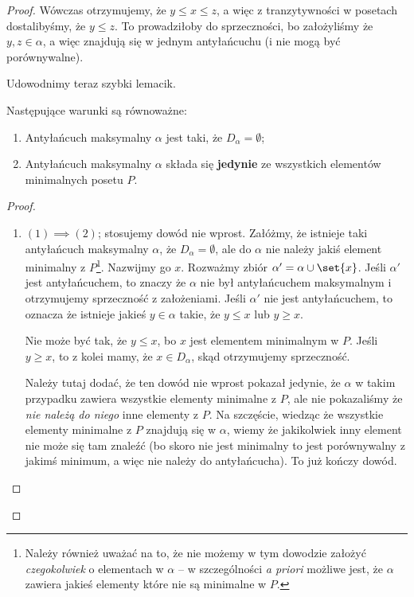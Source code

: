 \begin{proof}
        Wówczas otrzymujemy, że \(y \leq x \leq z\), a więc z tranzytywności w posetach dostalibyśmy, że \(y \leq z\). To prowadziłoby do sprzeczności, bo założyliśmy że \(y, z \in \alpha\), a więc znajdują się w jednym antyłańcuchu (i nie mogą być porównywalne).

        Udowodnimy teraz szybki lemacik.
        
        \begin{lemma}
            \label{dilworth-lemma-1}
            Następujące warunki są równoważne:
            
            \begin{enumerate}
                \item Antyłańcuch maksymalny \(\alpha\) jest taki, że \(D_{\alpha} = \emptyset\);
                \item Antyłańcuch maksymalny \(\alpha\) składa się \textbf{jedynie} ze wszystkich elementów minimalnych posetu \(P\). 
            \end{enumerate}
        \end{lemma}
        \begin{proof}
            \begin{enumerate}
                \item \( (1) \implies (2) \); stosujemy dowód nie wprost. Załóżmy, że istnieje taki antyłańcuch maksymalny \(\alpha\), że \(D_{\alpha} = \emptyset\), ale do \(\alpha\) nie należy jakiś element minimalny z \(P\)\footnote{Należy również uważać na to, że nie możemy w tym dowodzie założyć \textit{czegokolwiek} o elementach w \(\alpha\) -- w szczególności \textit{a priori} możliwe jest, że \(\alpha\) zawiera jakieś elementy które nie są minimalne w \(P\).}. Nazwijmy go \(x\). Rozważmy zbiór \( \alpha' = \alpha \cup \set{x}\). Jeśli \(\alpha'\) jest antyłańcuchem, to znaczy że \(\alpha\) nie był antyłańcuchem maksymalnym i otrzymujemy sprzeczność z założeniami. Jeśli \(\alpha'\) nie jest antyłańcuchem, to oznacza że istnieje jakieś \(y \in \alpha\) takie, że \( y \leq x\) lub \(y \geq x\). 
                
                Nie może być tak, że \(y \leq x\), bo \(x\) jest elementem minimalnym w \(P\). Jeśli \(y \geq x\), to z kolei mamy, że \(x \in D_{\alpha}\), skąd otrzymujemy sprzeczność.
                
                Należy tutaj dodać, że ten dowód nie wprost pokazał jedynie, że \(\alpha\) w takim przypadku zawiera wszystkie elementy minimalne z \(P\), ale nie pokazaliśmy że \textit{nie należą do niego} inne elementy z \(P\). Na szczęście, wiedząc że wszystkie elementy minimalne z \(P\) znajdują się w \(\alpha\), wiemy że jakikolwiek inny element nie może się tam znaleźć (bo skoro nie jest minimalny to jest porównywalny z jakimś minimum, a więc nie należy do antyłańcucha). To już kończy dowód.
                

\end{enumerate}
\end{proof}
\end{proof}
